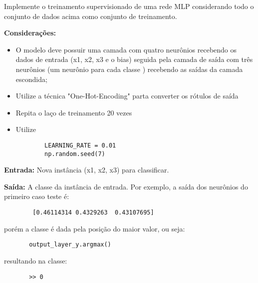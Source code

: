 \documentclass{article}
\begin{document}
Implemente o treinamento supervisionado de uma rede MLP considerando todo o conjunto de dados acima como conjunto de treinamento. 

\textbf{Considerações:}
\begin{itemize}
    \item O modelo deve possuir uma camada com quatro neurônios recebendo os dados de entrada (x1, x2, x3 e o bias) seguida pela camada de saída com três neurônios (um neurônio para cada classe ) recebendo as saídas da camada escondida;

    \item Utilize a técnica "One-Hot-Encoding" parta converter os rótulos de saída

    \item  Repita o laço de treinamento 20 vezes

    \item  Utilize 
    \begin{center}
    \begin{verbatim}
        LEARNING_RATE = 0.01
        np.random.seed(7)
    \end{verbatim}
\end{center}
\end{itemize}

\textbf{Entrada:} Nova instância (x1, x2, x3) para classificar.

\textbf{Saída:} A classe da instância de entrada. Por exemplo, a saída dos neurônios do primeiro caso teste é:

\begin{center}
    \begin{verbatim}
        [0.46114314 0.4329263  0.43107695]
    \end{verbatim}
\end{center}

porém a classe é dada pela posição do maior valor, ou seja:

\begin{center}
    \begin{verbatim}
       output_layer_y.argmax()
    \end{verbatim}
\end{center}

resultando na classe:
\begin{center}
    \begin{verbatim}
       >> 0
    \end{verbatim}
\end{center}
\end{document}
